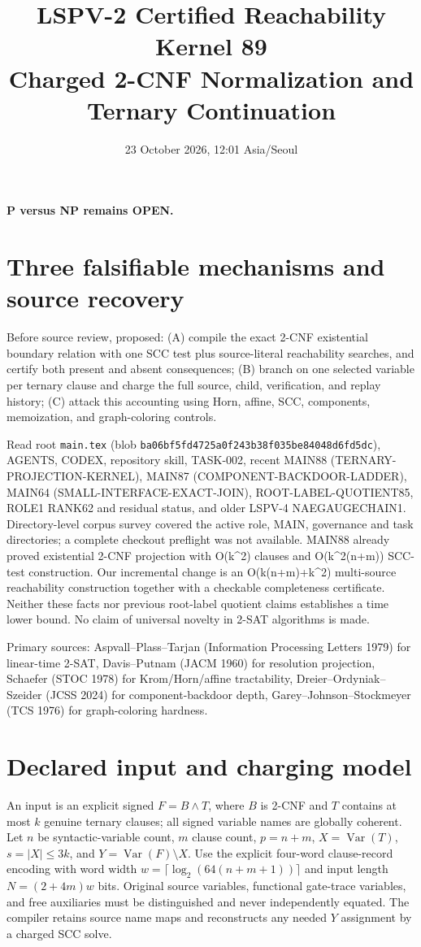 \documentclass[11pt]{article}
\title{LSPV-2 Certified Reachability Kernel 89\\Charged 2-CNF Normalization and Ternary Continuation}
\date{23 October 2026, 12:01 Asia/Seoul}
\begin{document}
\maketitle
\noindent\textbf{P versus NP remains OPEN.}
\section{Three falsifiable mechanisms and source recovery}
Before source review, proposed: (A) compile the exact 2-CNF existential boundary relation with one SCC test plus source-literal reachability searches, and certify both present and absent consequences; (B) branch on one selected variable per ternary clause and charge the full source, child, verification, and replay history; (C) attack this accounting using Horn, affine, SCC, components, memoization, and graph-coloring controls.

Read root \texttt{main.tex} (blob \texttt{ba06bf5fd4725a0f243b38f035be84048d6fd5dc}), AGENTS, CODEX, repository skill, TASK-002, recent MAIN88 (TERNARY-PROJECTION-KERNEL), MAIN87 (COMPONENT-BACKDOOR-LADDER), MAIN64 (SMALL-INTERFACE-EXACT-JOIN), ROOT-LABEL-QUOTIENT85, ROLE1 RANK62 and residual status, and older LSPV-4 NAEGAUGECHAIN1. Directory-level corpus survey covered the active role, MAIN, governance and task directories; a complete checkout preflight was not available. MAIN88 already proved existential 2-CNF projection with O(k^2) clauses and O(k^2(n+m)) SCC-test construction. Our incremental change is an O(k(n+m)+k^2) multi-source reachability construction together with a checkable completeness certificate. Neither these facts nor previous root-label quotient claims establishes a time lower bound. No claim of universal novelty in 2-SAT algorithms is made.

Primary sources: Aspvall--Plass--Tarjan (Information Processing Letters 1979) for linear-time 2-SAT, Davis--Putnam (JACM 1960) for resolution projection, Schaefer (STOC 1978) for Krom/Horn/affine tractability, Dreier--Ordyniak--Szeider (JCSS 2024) for component-backdoor depth, Garey--Johnson--Stockmeyer (TCS 1976) for graph-coloring hardness.
\section{Declared input and charging model}
An input is an explicit signed $F=B\wedge T$, where $B$ is 2-CNF and $T$ contains at most $k$ genuine ternary clauses; all signed variable names are globally coherent. Let $n$ be syntactic-variable count, $m$ clause count, $p=n+m$, $X=\operatorname{Var}(T)$, $s=|X|\le3k$, and $Y=\operatorname{Var}(F)\setminus X$. Use the explicit four-word clause-record encoding with word width $w=\lceil\log_2(64(n+m+1))\rceil$ and input length $N=(2+4m)w$ bits. Original source variables, functional gate-trace variables, and free auxiliaries must be distinguished and never independently equated. The compiler retains source name maps and reconstructs any needed $Y$ assignment by a charged SCC solve.
\end{document}
